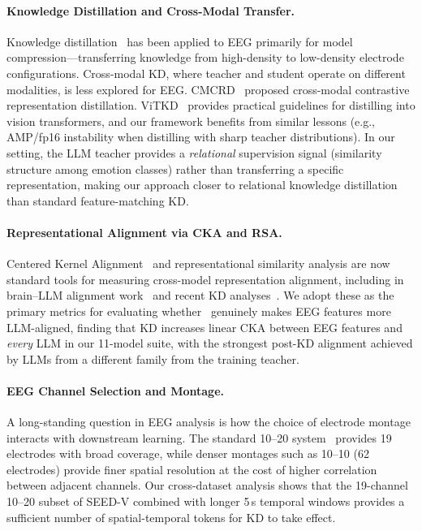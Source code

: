 \paragraph{Knowledge Distillation and Cross-Modal Transfer.}
Knowledge distillation~\cite{hinton2015distilling} has been applied to EEG primarily for model compression---transferring knowledge from high-density to low-density electrode configurations. Cross-modal KD, where teacher and student operate on different modalities, is less explored for EEG. CMCRD~\cite{cmcrd2025} proposed cross-modal contrastive representation distillation. ViTKD~\cite{vitkd2022} provides practical guidelines for distilling into vision transformers, and our framework benefits from similar lessons (e.g., AMP/fp16 instability when distilling with sharp teacher distributions). In our setting, the LLM teacher provides a \emph{relational} supervision signal (similarity structure among emotion classes) rather than transferring a specific representation, making our approach closer to relational knowledge distillation than standard feature-matching KD.

\paragraph{Representational Alignment via CKA and RSA.}
Centered Kernel Alignment~\cite{kornblith2019cka} and representational similarity analysis are now standard tools for measuring cross-model representation alignment, including in brain--LLM alignment work~\cite{brain_llm_compression2023,scaling_brain_alignment2024} and recent KD analyses~\cite{rethinking_cka_kd2024}. We adopt these as the primary metrics for evaluating whether \ours\ genuinely makes EEG features more LLM-aligned, finding that KD increases linear CKA between EEG features and \emph{every} LLM in our 11-model suite, with the strongest post-KD alignment achieved by LLMs from a different family from the training teacher.

\paragraph{EEG Channel Selection and Montage.}
A long-standing question in EEG analysis is how the choice of electrode montage interacts with downstream learning. The standard 10--20 system~\cite{ten_twenty_montage} provides 19 electrodes with broad coverage, while denser montages such as 10--10 (62 electrodes) provide finer spatial resolution at the cost of higher correlation between adjacent channels. Our cross-dataset analysis shows that the 19-channel 10--20 subset of SEED-V combined with longer 5\,s temporal windows provides a sufficient number of spatial-temporal tokens for KD to take effect.

